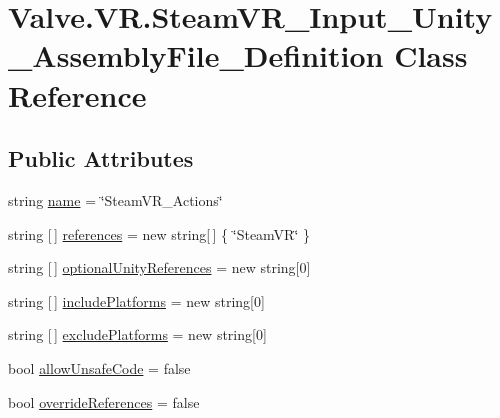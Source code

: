 \hypertarget{class_valve_1_1_v_r_1_1_steam_v_r___input___unity___assembly_file___definition}{}\section{Valve.\+V\+R.\+Steam\+V\+R\+\_\+\+Input\+\_\+\+Unity\+\_\+\+Assembly\+File\+\_\+\+Definition Class Reference}
\label{class_valve_1_1_v_r_1_1_steam_v_r___input___unity___assembly_file___definition}
\subsection*{Public Attributes}
\begin{DoxyCompactItemize}
\item 
string \mbox{\hyperlink{class_valve_1_1_v_r_1_1_steam_v_r___input___unity___assembly_file___definition_ac183f39dda94336f29672f5735d93b5b}{name}} = \char`\"{}Steam\+V\+R\+\_\+\+Actions\char`\"{}
\item 
string \mbox{[}$\,$\mbox{]} \mbox{\hyperlink{class_valve_1_1_v_r_1_1_steam_v_r___input___unity___assembly_file___definition_a9078f7cc911b68ca61c279deb69c8d8d}{references}} = new string\mbox{[}$\,$\mbox{]} \{ \char`\"{}Steam\+VR\char`\"{} \}
\item 
string \mbox{[}$\,$\mbox{]} \mbox{\hyperlink{class_valve_1_1_v_r_1_1_steam_v_r___input___unity___assembly_file___definition_a62a378470b5909af5501232dc5ec44b6}{optional\+Unity\+References}} = new string\mbox{[}0\mbox{]}
\item 
string \mbox{[}$\,$\mbox{]} \mbox{\hyperlink{class_valve_1_1_v_r_1_1_steam_v_r___input___unity___assembly_file___definition_a7412375731fa1f9a700a5afc03ae7423}{include\+Platforms}} = new string\mbox{[}0\mbox{]}
\item 
string \mbox{[}$\,$\mbox{]} \mbox{\hyperlink{class_valve_1_1_v_r_1_1_steam_v_r___input___unity___assembly_file___definition_a18d6c80002c07c2f51754b9445a716e1}{exclude\+Platforms}} = new string\mbox{[}0\mbox{]}
\item 
bool \mbox{\hyperlink{class_valve_1_1_v_r_1_1_steam_v_r___input___unity___assembly_file___definition_a4d0c04e358771b9d787a75806925912c}{allow\+Unsafe\+Code}} = false
\item 
bool \mbox{\hyperlink{class_valve_1_1_v_r_1_1_steam_v_r___input___unity___assembly_file___definition_a6b7ced539a444482491275563d0c014a}{override\+References}} = false
\item 

\end{DoxyCompactItemize}
